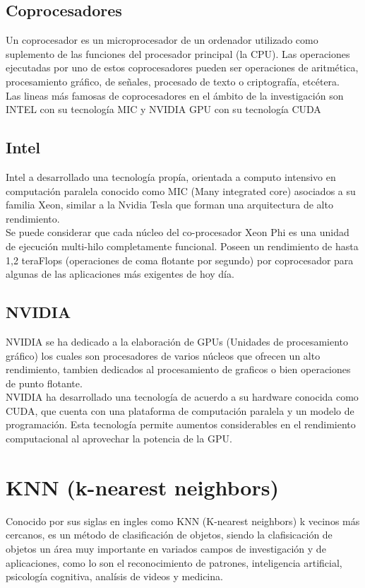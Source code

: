 \subsection{Coprocesadores}

Un coprocesador es un microprocesador de un ordenador utilizado como suplemento de las funciones del procesador principal (la CPU). Las operaciones ejecutadas por uno de estos coprocesadores pueden ser operaciones de aritmética, procesamiento gráfico, de señales, procesado de texto o criptografía, etcétera.
\\
Las lineas más famosas de coprocesadores en el ámbito de la investigación son INTEL con su tecnología MIC y NVIDIA GPU con su tecnología CUDA

\subsection{Intel}
Intel a desarrollado una tecnología propía, orientada a computo intensivo en computación paralela conocido como MIC (Many integrated core) asociados a su familia Xeon, similar a la Nvidia Tesla que forman una arquitectura de alto rendimiento. \\
Se puede considerar que cada núcleo del co-procesador Xeon Phi es una unidad de ejecución
multi-hilo completamente funcional. Poseen un rendimiento de hasta 1,2 teraFlops  (operaciones de coma flotante por segundo) por coprocesador para algunas de las aplicaciones más exigentes de hoy día.

\subsection{NVIDIA}
NVIDIA se ha dedicado a la elaboración de GPUs (Unidades de procesamiento gráfico) los cuales son procesadores de varios núcleos que ofrecen un alto rendimiento, tambien dedicados al procesamiento de graficos o bien operaciones de punto flotante. \\
NVIDIA ha desarrollado una tecnología de acuerdo a su hardware conocida como CUDA, que cuenta con una plataforma de computación paralela y un modelo de programación. Esta tecnología permite aumentos considerables en el rendimiento computacional al aprovechar la potencia de la GPU.

\section{KNN (k-nearest neighbors)}

Conocido por sus siglas en ingles como KNN (K-nearest neighbors) k vecinos más cercanos, es un método de clasificación de objetos, siendo la clafisicación de objetos un área muy importante en variados campos de investigación y de aplicaciones, como lo son el reconocimiento de patrones, inteligencia artificial, psicología cognitiva, analísis de videos y medicina.  